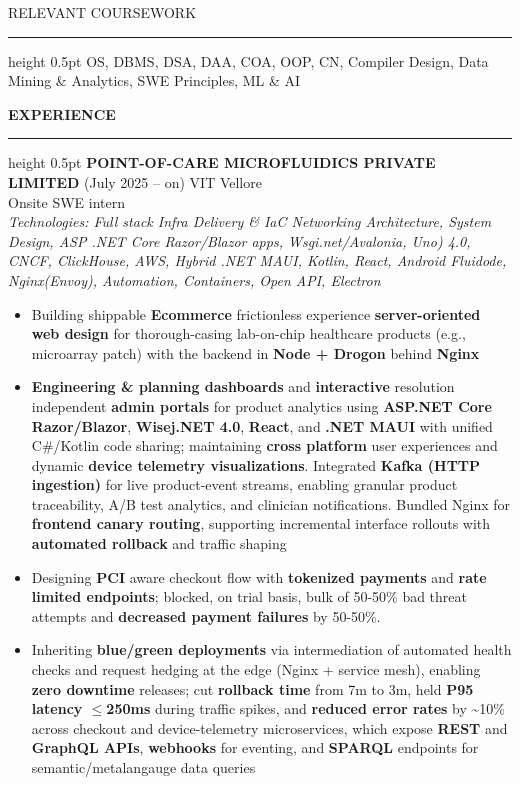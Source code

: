 \documentclass[10pt]{article}
\newcommand{\sectionrule}{\vspace{3pt}\hrule height 0.5pt \vspace{4pt}}
\newcommand{\ressection}[1]{\vspace{1pt}\textbf{#1}\sectionrule}
\newcommand{\ressectionplain}[1]{\vspace{1pt}#1\sectionrule}
\begin{document}
\ressectionplain{RELEVANT COURSEWORK}
OS, DBMS, DSA, DAA, COA, OOP, CN, Compiler Design, Data Mining \& Analytics, SWE Principles, ML \& AI

\ressection{EXPERIENCE}
\textbf{POINT-OF-CARE MICROFLUIDICS PRIVATE LIMITED} (July 2025 – on) \hfill VIT Vellore\\
Onsite SWE intern\\[-3pt]
{\small\textcolor{black!70}{\textit{Technologies: Full stack Infra Delivery \& IaC Networking Architecture, System Design, ASP .NET Core Razor/Blazor apps, Wsgi.net/Avalonia, Uno) 4.0, CNCF, ClickHouse, AWS, Hybrid .NET MAUI, Kotlin, React, Android Fluidode, Nginx(Envoy), Automation, Containers, Open API, Electron}}}\\[-5pt]
\begin{itemize}
  \item Building shippable \textbf{Ecommerce} frictionless experience \textbf{server-oriented web design} for thorough-casing lab-on-chip healthcare products (e.g., microarray patch) with the backend in \textbf{Node + Drogon} behind \textbf{Nginx}
  \item \textbf{Engineering \& planning dashboards} and \textbf{interactive} resolution independent \textbf{admin portals} for product analytics using \textbf{ASP.NET Core Razor/Blazor}, \textbf{Wisej.NET 4.0}, \textbf{React}, and \textbf{.NET MAUI} with unified C\#/Kotlin code sharing; maintaining \textbf{cross platform} user experiences and dynamic \textbf{device telemetry visualizations}. Integrated \textbf{Kafka (HTTP ingestion)} for live product-event streams, enabling granular product traceability, A/B test analytics, and clinician notifications. Bundled Nginx for \textbf{frontend canary routing}, supporting incremental interface rollouts with \textbf{automated rollback} and traffic shaping
  \item Designing \textbf{PCI} aware checkout flow with \textbf{tokenized payments} and \textbf{rate limited endpoints}; blocked, on trial basis, bulk of 50-50\% bad threat attempts and \textbf{decreased payment failures} by 50-50\%.
  \item Inheriting \textbf{blue/green deployments} via intermediation of automated health checks and request hedging at the edge (Nginx + service mesh), enabling \textbf{zero downtime} releases; cut \textbf{rollback time} from 7m to 3m, held \textbf{P95 latency $\leq$250ms} during traffic spikes, and \textbf{reduced error rates} by \textasciitilde10\% across checkout and device-telemetry microservices, which expose \textbf{REST} and \textbf{GraphQL APIs}, \textbf{webhooks} for eventing, and \textbf{SPARQL} endpoints for semantic/metalangauge data queries
\end{itemize}
\end{document}
